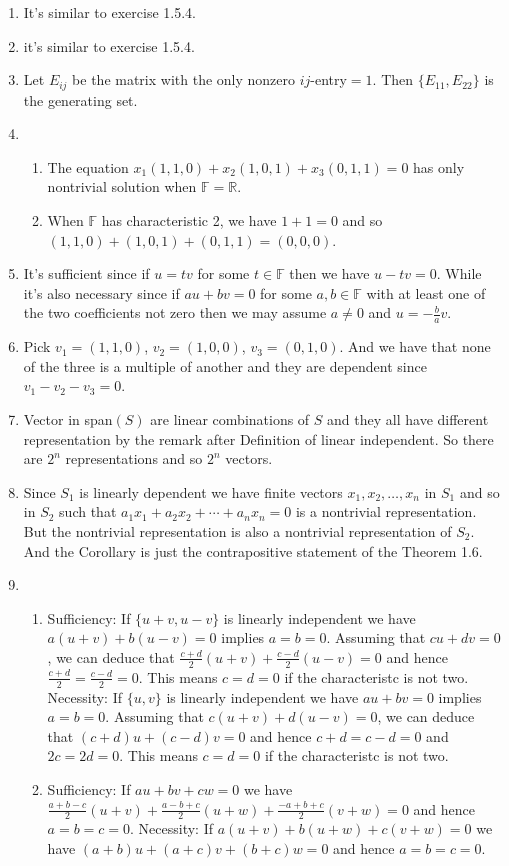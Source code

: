 \begin{enumerate}
\item It's similar to exercise 1.5.4.
\item it's similar to exercise 1.5.4.
\item Let $E_{ij}$ be the matrix with the only nonzero $ij$-entry$=1$. Then $\{E_{11},E_{22}\}$ is the generating set.
\item \begin{enumerate}
\item The equation $x_1(1,1,0)+x_2(1,0,1)+x_3(0,1,1)=0$ has only nontrivial solution when $\mathbb{F}=\mathbb{R}$.
\item When $\mathbb{F}$ has characteristic 2, we have $1+1=0$ and so $(1,1,0)+(1,0,1)+(0,1,1)=(0,0,0)$.
\end{enumerate}
\item It's sufficient since if $u=tv$ for some $t\in \mathbb{F}$ then we have $u-tv=0$. While it's also necessary since if $au+bv=0$ for some $a,b\in \mathbb{F}$ with at least one of the two coefficients not zero then we may assume $a\neq0$ and $u=-\frac{b}{a}v$.
\item Pick $v_1=(1,1,0)$, $v_2=(1,0,0)$, $v_3=(0,1,0)$. And we have that none of the three is a multiple of another and they are dependent since $v_1-v_2-v_3=0$.
\item Vector in span$(S)$ are linear combinations of $S$ and they all have different representation by the remark after Definition of linear independent. So there are $2^n$ representations and so $2^n$ vectors.
\item Since $S_1$ is linearly dependent we have finite vectors $x_1,x_2,\ldots ,x_n$ in $S_1$ and so in $S_2$ such that $a_1x_1+a_2x_2+\cdots +a_nx_n=0$ is a nontrivial representation. But the nontrivial representation is also a nontrivial representation of $S_2$. And the Corollary is just the contrapositive statement of the Theorem 1.6.
\item \begin{enumerate}
\item Sufficiency: If $\{u+v,u-v\}$ is linearly independent we have $a(u+v)+b(u-v)=0$ implies $a=b=0$. Assuming that $cu+dv=0$, we can deduce that $\frac{c+d}{2}(u+v)+\frac{c-d}{2}(u-v)=0$ and hence $\frac{c+d}{2}=\frac{c-d}{2}=0$. This means $c=d=0$ if the characteristc is not two. Necessity: If $\{u,v\}$ is linearly independent we have $au+bv=0$ implies $a=b=0$. Assuming that $c(u+v)+d(u-v)=0$, we can deduce that $(c+d)u+(c-d)v=0$ and hence $c+d=c-d=0$ and $2c=2d=0$. This means $c=d=0$ if the characteristc is not two.
\item Sufficiency: If $au+bv+cw=0$ we have $\frac{a+b-c}{2}(u+v)+\frac{a-b+c}{2}(u+w)+\frac{-a+b+c}{2}(v+w)=0$ and hence $a=b=c=0$. Necessity: If $a(u+v)+b(u+w)+c(v+w)=0$ we have $(a+b)u+(a+c)v+(b+c)w=0$ and hence $a=b=c=0$.

\end{enumerate}
\end{enumerate}
